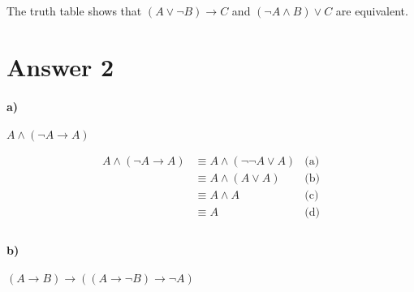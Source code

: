 \documentclass[12pt]{article}
\begin{document}
The truth table shows that $ (A \vee \neg B) \rightarrow C $ and $ (\neg A \wedge B) \vee C $ are equivalent.

\section*{Answer 2}

\paragraph{a)} $ A \wedge (\neg A \rightarrow A) $

\begin{align*}
    A \wedge (\neg A \rightarrow A) & \equiv A \wedge (\neg \neg A \vee A) & \text{(a)} \\
                                    & \equiv A \wedge (A \vee A)           & \text{(b)} \\
                                    & \equiv A \wedge A                    & \text{(c)} \\
                                    & \equiv A                             & \text{(d)} \\
\end{align*}

\paragraph{b)} $ (A \rightarrow B) \rightarrow ((A \rightarrow \neg B) \rightarrow \neg A) $
\end{document}
